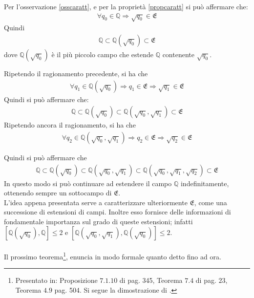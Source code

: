 \noindent
Per l'osservazione \ref{osscaratt}, e per la proprietà \ref{propcaratt} si può affermare che:
\begin{align*}
\forall q_0 \in \mathbb{Q} \Rightarrow \sqrt{q_0} \in \mathfrak{E}
\end{align*}
\noindent
Quindi
\begin{align*}
\mathbb{Q} \subset \mathbb{Q}(\sqrt{q_0}) \subset \mathfrak{E}
\end{align*}
\noindent
dove $\mathbb{Q}(\sqrt{q_0})$ è il più piccolo campo che estende $\mathbb{Q}$ contenente $\sqrt{q_0}$.

\noindent
Ripetendo il ragionamento precedente, si ha che
\begin{align*}
\forall q_1 \in \mathbb{Q}(\sqrt{q_0}) \Rightarrow q_1 \in \mathfrak{E} \Rightarrow \sqrt{q_1} \in \mathfrak{E}
\end{align*}
\noindent
Quindi si può affermare che: 
\begin{align*}
\mathbb{Q}\subset \mathbb{Q}(\sqrt{q_0}) \subset  \mathbb{Q}(\sqrt{q_0},\sqrt{q_1}) \subset \mathfrak{E}
\end{align*}
\noindent
Ripetendo ancora il ragionamento, si ha che
\begin{align*}
\forall q_2 \in \mathbb{Q}(\sqrt{q_0},\sqrt{q_1})  \Rightarrow q_2 \in \mathfrak{E} \Rightarrow \sqrt{q_2} \in \mathfrak{E}
\end{align*}

\noindent
Quindi si può affermare che 
\begin{align*}
\mathbb{Q}\subset \mathbb{Q}(\sqrt{q_0}) \subset  \mathbb{Q}(\sqrt{q_0},\sqrt{q_1}) \subset \mathbb{Q}(\sqrt{q_0},\sqrt{q_1}, \sqrt{q_2}) \subset \mathfrak{E}
\end{align*}
\noindent
In questo modo si può continuare ad estendere il campo $\mathbb{Q}$ indefinitamente, ottenendo sempre un sottocampo di $\mathfrak{E}$.
\\

L'idea appena presentata serve a caratterizzare ulteriormente $\mathfrak{E}$, come una successione di estensioni di campi. Inoltre esso fornisce delle informazioni di fondamentale importanza sul grado di queste estensioni; infatti $[ \mathbb{Q}(\sqrt{q_0}), \mathbb{Q}] \leq 2$ e  $ [ \mathbb{Q}(\sqrt{q_0},\sqrt{q_1}), \mathbb{Q}(\sqrt{q_0})] \leq 2  $.
\\ \\
Il prossimo teorema\footnote{Presentato in: \cite{cattaneo} Proposizione $7.1.10$ di  pag. 345,  \cite{Procesi} Teorema $7.4$ di pag. $23$, \cite{Artin} Teorema $4.9$  pag. 504. Si segue la dimostrazione di \cite{Procesi}. }, enuncia in modo formale quanto detto fino ad ora. 

